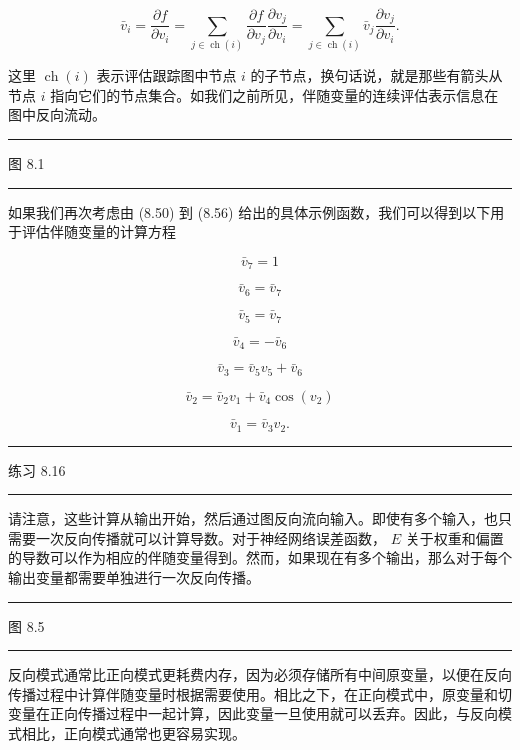 \documentclass[10pt]{report}
\newcommand{\HRule}{\begin{center}\rule{0.9\linewidth}{0.2mm}\end{center}}
\begin{document}
\[
{\bar{v}}_{i} = \frac{\partial f}{\partial {v}_{i}} = \mathop{\sum }\limits_{{j \in  \operatorname{ch}\left( i\right) }}\frac{\partial f}{\partial {v}_{j}}\frac{\partial {v}_{j}}{\partial {v}_{i}} = \mathop{\sum }\limits_{{j \in  \operatorname{ch}\left( i\right) }}{\bar{v}}_{j}\frac{\partial {v}_{j}}{\partial {v}_{i}}. \tag{8.69}
\]

这里 \(\operatorname{ch}\left( i\right)\) 表示评估跟踪图中节点 \(i\) 的子节点，换句话说，就是那些有箭头从节点 \(i\) 指向它们的节点集合。如我们之前所见，伴随变量的连续评估表示信息在图中反向流动。

\HRule

图 8.1

\HRule

如果我们再次考虑由 (8.50) 到 (8.56) 给出的具体示例函数，我们可以得到以下用于评估伴随变量的计算方程

\[
{\bar{v}}_{7} = 1 \tag{8.70}
\]

\[
{\bar{v}}_{6} = {\bar{v}}_{7} \tag{8.71}
\]

\[
{\bar{v}}_{5} = {\bar{v}}_{7} \tag{8.72}
\]

\[
{\bar{v}}_{4} =  - {\bar{v}}_{6} \tag{8.73}
\]

\[
{\bar{v}}_{3} = {\bar{v}}_{5}{v}_{5} + {\bar{v}}_{6} \tag{8.74}
\]

\[
{\bar{v}}_{2} = {\bar{v}}_{2}{v}_{1} + {\bar{v}}_{4}\cos \left( {v}_{2}\right)  \tag{8.75}
\]

\[
{\bar{v}}_{1} = {\bar{v}}_{3}{v}_{2}. \tag{8.76}
\]

\HRule

练习 8.16

\HRule

请注意，这些计算从输出开始，然后通过图反向流向输入。即使有多个输入，也只需要一次反向传播就可以计算导数。对于神经网络误差函数， \(E\) 关于权重和偏置的导数可以作为相应的伴随变量得到。然而，如果现在有多个输出，那么对于每个输出变量都需要单独进行一次反向传播。

\HRule

图 8.5

\HRule

反向模式通常比正向模式更耗费内存，因为必须存储所有中间原变量，以便在反向传播过程中计算伴随变量时根据需要使用。相比之下，在正向模式中，原变量和切变量在正向传播过程中一起计算，因此变量一旦使用就可以丢弃。因此，与反向模式相比，正向模式通常也更容易实现。
\end{document}

